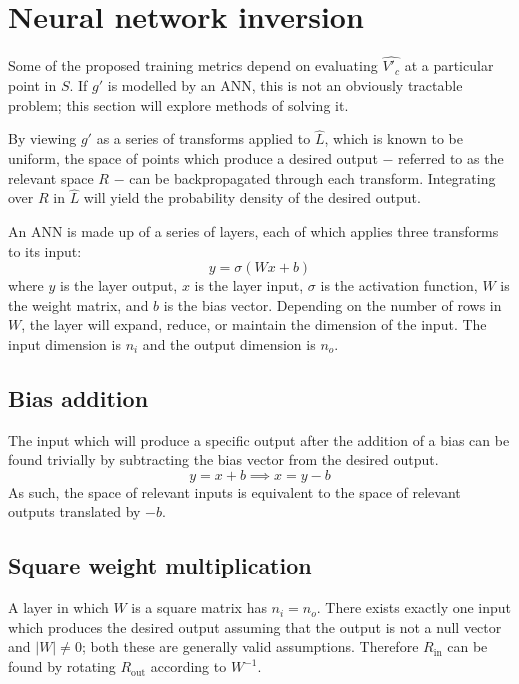 \documentclass[../../main.tex]{subfiles}
\begin{document}
\section{Neural network inversion} \label{section:neuralNetworkInversion}

Some of the proposed training metrics depend on evaluating $\hat{V'_c}$ at a particular point in $S$.
If $g'$ is modelled by an ANN, this is not an obviously tractable problem; this section will explore methods of solving it.

By viewing $g'$ as a series of transforms applied to $\hat{L}$, which is known to be uniform, the space of points which produce a desired output $-$ referred to as the relevant space $R$ $-$ can be backpropagated through each transform.
Integrating over $R$ in $\hat{L}$ will yield the probability density of the desired output.

An ANN is made up of a series of layers, each of which applies three transforms to its input:
\begin{equation}
    y=\sigma(Wx+b)
\end{equation}
where $y$ is the layer output, $x$ is the layer input, $\sigma$ is the activation function, $W$ is the weight matrix, and $b$ is the bias vector.
Depending on the number of rows in $W$, the layer will expand, reduce, or maintain the dimension of the input.
The input dimension is $n_i$ and the output dimension is $n_o$.

\subsection{Bias addition} \label{subsection:biasAddition}

The input which will produce a specific output after the addition of a bias can be found trivially by subtracting the bias vector from the desired output.
\begin{equation}
    y=x+b\implies x=y-b
\end{equation}
As such, the space of relevant inputs is equivalent to the space of relevant outputs translated by $-b$.

\subsection{Square weight multiplication} \label{subsection:squareWeightMultiplication}

A layer in which $W$ is a square matrix has $n_i=n_o$.
There exists exactly one input which produces the desired output assuming that the output is not a null vector and $|W|\neq 0$; both these are generally valid assumptions.
Therefore $R_\text{in}$ can be found by rotating $R_\text{out}$ according to $W^{-1}$.
\end{document}
